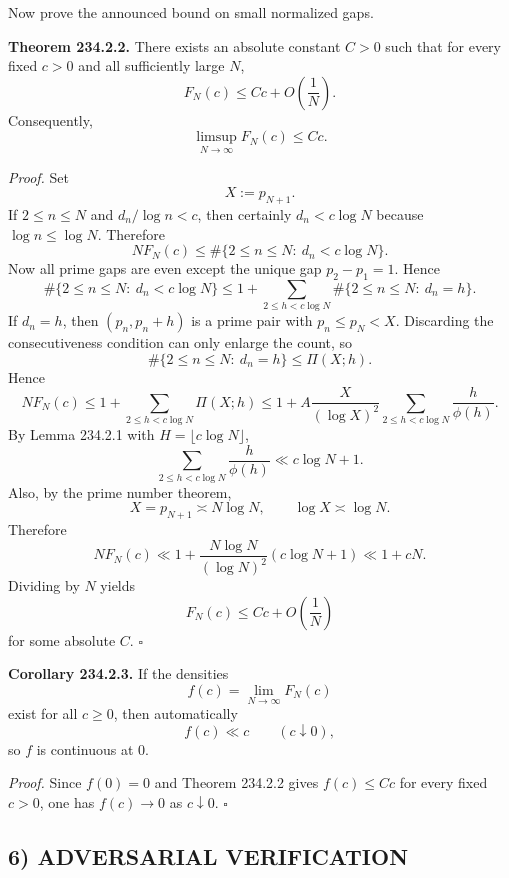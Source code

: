 Now prove the announced bound on small normalized gaps.

\medskip
\noindent
\textbf{Theorem 234.2.2.}
There exists an absolute constant $C>0$ such that for every fixed $c>0$ and all sufficiently large $N$,
\[
F_N(c)\le Cc+O\!\left(\frac{1}{N}\right).
\]
Consequently,
\[
\limsup_{N\to\infty}F_N(c)\le Cc.
\]

\emph{Proof.}
Set
\[
X:=p_{N+1}.
\]
If $2\le n\le N$ and $d_n/\log n<c$, then certainly $d_n<c\log N$ because $\log n\le \log N$.
Therefore
\[
N F_N(c)
\le
\#\{2\le n\le N:\ d_n<c\log N\}.
\]
Now all prime gaps are even except the unique gap $p_2-p_1=1$. Hence
\[
\#\{2\le n\le N:\ d_n<c\log N\}
\le
1+\sum_{2\le h<c\log N}\#\{2\le n\le N:\ d_n=h\}.
\]
If $d_n=h$, then $(p_n,p_n+h)$ is a prime pair with $p_n\le p_N<X$. Discarding the consecutiveness condition can only enlarge the count, so
\[
\#\{2\le n\le N:\ d_n=h\}\le \Pi(X;h).
\]
Hence
\[
N F_N(c)
\le
1+\sum_{2\le h<c\log N}\Pi(X;h)
\le
1+A\frac{X}{(\log X)^2}\sum_{2\le h<c\log N}\frac{h}{\phi(h)}.
\]
By Lemma 234.2.1 with $H=\lfloor c\log N\rfloor$,
\[
\sum_{2\le h<c\log N}\frac{h}{\phi(h)}\ll c\log N+1.
\]
Also, by the prime number theorem,
\[
X=p_{N+1}\asymp N\log N,
\qquad
\log X\asymp \log N.
\]
Therefore
\[
N F_N(c)
\ll
1+\frac{N\log N}{(\log N)^2}(c\log N+1)
\ll
1+cN.
\]
Dividing by $N$ yields
\[
F_N(c)\le Cc+O\!\left(\frac{1}{N}\right)
\]
for some absolute $C$.
\hfill$\square$
\medskip

\noindent
\textbf{Corollary 234.2.3.}
If the densities
\[
f(c)=\lim_{N\to\infty}F_N(c)
\]
exist for all $c\ge 0$, then automatically
\[
f(c)\ll c \qquad (c\downarrow 0),
\]
so $f$ is continuous at $0$.

\emph{Proof.}
Since $f(0)=0$ and Theorem 234.2.2 gives $f(c)\le Cc$ for every fixed $c>0$, one has $f(c)\to 0$ as $c\downarrow 0$.
\hfill$\square$

\subsection*{6) ADVERSARIAL VERIFICATION}

